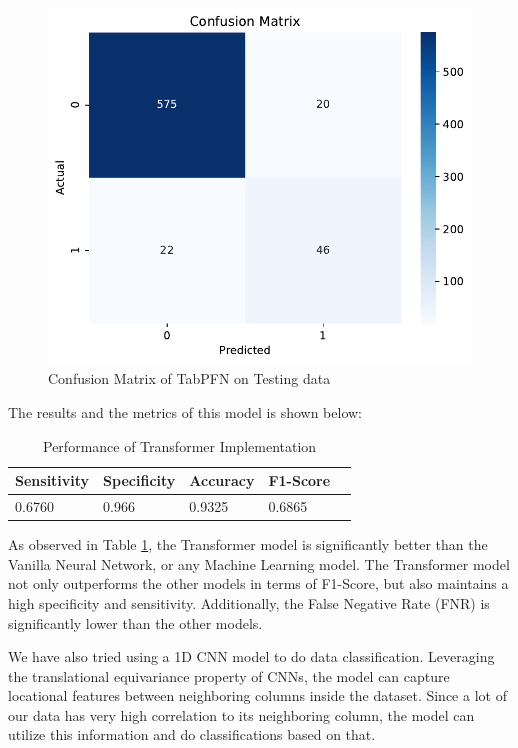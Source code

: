 \documentclass[10pt,letterpaper]{article}
\begin{document}
\begin{figure}[H]
    \centering
    \includegraphics[width=0.5\linewidth]{plots/tabpfn_confusion_matrix.pdf}
    \caption{Confusion Matrix of TabPFN on Testing data}
    \label{fig:confusion-matrix-transformer}
\end{figure}

The results and the metrics of this model is shown below:

\begin{table}[H]
\centering
\footnotesize
\begin{tabular}{lllll}
\toprule
\textbf{Sensitivity} & \textbf{Specificity} & \textbf{Accuracy} &  \textbf{F1-Score}\\
\midrule
0.6760 & 0.966 & 0.9325 & 0.6865  \\
\bottomrule
\end{tabular}
\caption{Performance of Transformer Implementation}%
\label{table:Tabpfn-metrics}
\end{table}

As observed in Table \ref{table:Tabpfn-metrics}, the Transformer model is significantly better than the Vanilla Neural Network, or any Machine Learning model.
The Transformer model not only outperforms the other models in terms of F1-Score, but also maintains a high specificity and sensitivity.
Additionally, the False Negative Rate (FNR) is significantly lower than the other models. 

We have also tried using a 1D CNN model to do data classification. Leveraging the translational 
equivariance property of CNNs, the model can capture locational features between neighboring 
columns inside the dataset. Since a lot of our data has very high correlation to its neighboring column, 
the model can utilize this information and do classifications based on that.
\end{document}
